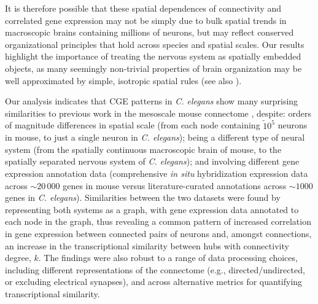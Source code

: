 \documentclass[10pt,letterpaper]{article}
\begin{document}
{It is therefore possible that these spatial dependences of connectivity and correlated gene expression may not be simply due to bulk spatial trends in macroscopic brains containing millions of neurons, but may reflect conserved organizational principles that hold across species and spatial scales.
Our results highlight the importance of treating the nervous system as spatially embedded objects, as many seemingly non-trivial properties of brain organization may be well approximated by simple, isotropic spatial rules \cite{Henderson:2014fg, Roberts2016, Horvat:2016ia, Bassett:2010hf, Chen:2006ie} (see also \cite{Bullmore:2012vl, Betzel:2016jt}).


Our analysis indicates that CGE patterns in \emph{C. elegans} show many surprising similarities to previous work in the mesoscale mouse connectome \cite{Fulcher:2016ck}, despite:
orders of magnitude differences in spatial scale (from each node containing $\tilde 10^5$ neurons in mouse, to just a single neuron in \emph{C. elegans});
being a different type of neural system (from the spatially continuous macroscopic brain of mouse, to the spatially separated nervous system of \emph{C. elegans});
and involving different gene expression annotation data (comprehensive \emph{in situ} hybridization expression data across $\sim20\,000$ genes in mouse versus literature-curated annotations across $\sim 1000$ genes in \emph{C. elegans}).
Similarities between the two datasets were found by representing both systems as a graph, with gene expression data annotated to each node in the graph, thus revealing a common pattern of increased correlation in gene expression between connected pairs of neurons and, amongst connections, an increase in the transcriptional similarity between hubs with connectivity degree, $k$.
The findings were also robust to a range of data processing choices, including different representations of the connectome (e.g., directed/undirected, or excluding electrical synapses), and across alternative metrics for quantifying transcriptional similarity.

}
\end{document}
